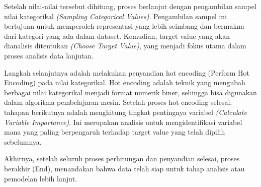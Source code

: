Setelah nilai-nilai tersebut dihitung, proses berlanjut dengan pengambilan sampel nilai kategorikal \textit{(Sampling Categorical Values)}. Pengambilan sampel ini bertujuan untuk memperoleh representasi yang lebih seimbang dan bermakna dari kategori yang ada dalam dataset. Kemudian, target value yang akan dianalisis ditentukan \textit{(Choose Target Value)}, yang menjadi fokus utama dalam proses analisis data lanjutan.

Langkah selanjutnya adalah melakukan penyandian hot encoding (Perform Hot Encoding) pada nilai kategorikal. Hot encoding adalah teknik yang mengubah berbagai nilai kategorikal menjadi format numerik biner, sehingga bisa digunakan dalam algoritma pembelajaran mesin. Setelah proses hot encoding selesai, tahapan berikutnya adalah menghitung tingkat pentingnya variabel \textit{(Calculate Variable Importance)}. Ini merupakan analisis untuk mengidentifikasi variabel mana yang paling berpengaruh terhadap target value yang telah dipilih sebelumnya.

Akhirnya, setelah seluruh proses perhitungan dan penyandian selesai, proses berakhir (End), menandakan bahwa data telah siap untuk tahap analisis atau pemodelan lebih lanjut.
